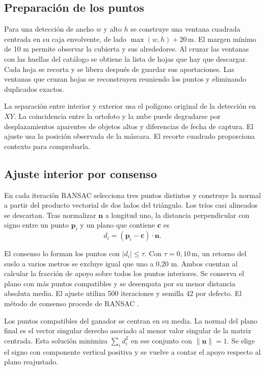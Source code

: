 \subsection{Preparación de los puntos}

Para una detección de ancho \(w\) y alto \(h\) se construye una ventana cuadrada centrada en su caja envolvente, de lado \(\max(w,h)+20\,\mathrm{m}\). El margen mínimo de 10 m permite observar la cubierta y sus alrededores. Al cruzar las ventanas con las huellas del catálogo se obtiene la lista de hojas que hay que descargar. Cada hoja se recorta y se libera después de guardar sus aportaciones. Las ventanas que cruzan hojas se reconstruyen reuniendo los puntos y eliminando duplicados exactos.

La separación entre interior y exterior usa el polígono original de la detección en \(XY\). La coincidencia entre la ortofoto y la nube puede degradarse por desplazamientos aparentes de objetos altos y diferencias de fecha de captura. El ajuste usa la posición observada de la máscara. El recorte cuadrado proporciona contexto para comprobarla.

\subsection{Ajuste interior por consenso}

En cada iteración RANSAC selecciona tres puntos distintos y construye la normal a partir del producto vectorial de dos lados del triángulo. Los tríos casi alineados se descartan. Tras normalizar \(\mathbf n\) a longitud uno, la distancia perpendicular con signo entre un punto \(\mathbf p_i\) y un plano que contiene \(\mathbf c\) es
\[
d_i=(\mathbf p_i-\mathbf c)\cdot\mathbf n.
\]

El consenso lo forman los puntos con \(\lvert d_i\rvert\leq\tau\). Con \(\tau=0{,}10\,\mathrm{m}\), un retorno del suelo a varios metros se excluye igual que uno a 0,20 m. Ambos cuentan al calcular la fracción de apoyo sobre todos los puntos interiores. Se conserva el plano con más puntos compatibles y se desempata por su menor distancia absoluta media. El ajuste utiliza 500 iteraciones y semilla 42 por defecto. El método de consenso procede de RANSAC \cite{ransac}.

Los puntos compatibles del ganador se centran en su media. La normal del plano final es el vector singular derecho asociado al menor valor singular de la matriz centrada. Esta solución minimiza \(\sum_i d_i^2\) en ese conjunto con \(\|\mathbf n\|=1\). Se elige el signo con componente vertical positiva y se vuelve a contar el apoyo respecto al plano reajustado.

